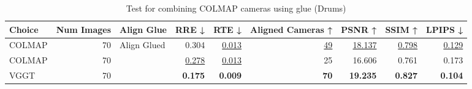 \begin{table}[H]
\caption{Test for combining COLMAP cameras using glue (Drums)}
\label{tab:99_align_glue_drums}
\centering
\scriptsize
\begin{tabular}{lrlrrrrrr}
\toprule
Choice & Num Images & Align Glue & RRE ↓ & RTE ↓ & Aligned Cameras ↑ & PSNR ↑ & SSIM ↑ & LPIPS ↓ \\
\midrule
COLMAP & 70 & Align Glued & 0.304 & \underline{0.013} & \underline{49} & \underline{18.137} & \underline{0.798} & \underline{0.129} \\
COLMAP & 70 &  & \underline{0.278} & \underline{0.013} & 25 & 16.606 & 0.761 & 0.173 \\
VGGT & 70 &  & \textbf{0.175} & \textbf{0.009} & \textbf{70} & \textbf{19.235} & \textbf{0.827} & \textbf{0.104} \\
\bottomrule
\end{tabular}
\end{table}
